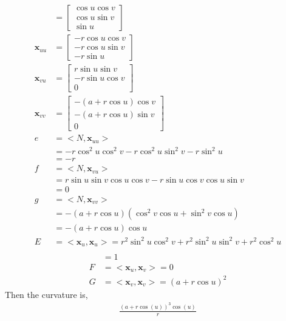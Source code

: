 \documentclass[12pt,letterpaper]{hmcpset}
\begin{document}
\begin{align*}
                              &= \begin{bmatrix}\cos u \cos v\\\cos u \sin v\\\sin u\end{bmatrix} \\
  \mathbf{x}_{uu} &= \begin{bmatrix}-r\cos u \cos v \\
    -r \cos u \sin v \\
    -r \sin u
  \end{bmatrix} \\
  \mathbf{x}_{vu} &= \begin{bmatrix}
    r\sin u \sin v \\
    -r\sin u \cos v \\
    0
  \end{bmatrix} \\
  \mathbf{x}_{vv} &= \begin{bmatrix}
    -(a + r\cos u) \cos v \\
    -(a + r\cos u) \sin v \\
    0
  \end{bmatrix} \\
  e &= <N, \mathbf{x}_{uu}> \\
          &= -r \cos^2 u \cos^2 v - r \cos^2 u \sin^2 v - r \sin^2 u \\
          &= -r \\
  f &= <N, \mathbf{x}_{vu}> \\
          &= r \sin u \sin v \cos u \cos v - r \sin u \cos v \cos u \sin v \\
          &= 0 \\
            g &= <N, \mathbf{x}_{vv}> \\
          &= -(a + r\cos u)(\cos^2 v \cos u + \sin^2 v \cos u) \\
          &= -(a + r \cos u) \cos u \\
  E &= <\mathbf{x}_u, \mathbf{x}_u> = r^2 \sin^2 u \cos^2 v + r^2 \sin^2 u \sin^2 v + r^2 \cos^2 u \\
\end{align*}
\begin{align*}
          &= 1\\
  F &= <\mathbf{x}_u, \mathbf{x}_v> = 0 \\
  G &= <\mathbf{x}_v, \mathbf{x}_v> = (a + r \cos u)^2 
\end{align*}
Then the curvature is,
\begin{align*}
  \frac{\left(a + r \cos{\left(u \right)}\right)^3 \cos{\left(u
\right)}}{r}
  \end{align*}
\end{document}

